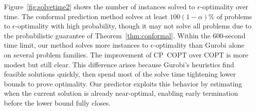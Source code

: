 \documentclass[12pt]{article}
\renewcommand{\cite}[1]{\citep{#1}}
\theoremstyle{definition}
\theoremstyle{remark}
\newcommand{\snote}[1]{}
\renewcommand{\snote}[1]{\textcolor{blue}{\textbf{\small [S: #1]}}}
\newcommand{\tol}{\epsilon}
\newcommand{\errorprob}{\alpha}
\newcommand{\snote}[1]{}
\renewcommand{\snote}[1]{\textcolor{blue}{\textbf{\small [Stefan: #1]}}}
\newcommand{\tol}{\epsilon}
\newcommand{\errorprob}{\alpha}
\theoremstyle{plain}
\theoremstyle{definition}
\theoremstyle{remark}
\begin{document}
Figure~\ref{fig:solvetime2} shows the number of instances solved to $\tol$-optimality over time.
The conformal prediction method solves at least $100(1-\errorprob)\%$ of problems to $\tol$-optimality with high probability, though it may not solve all problems due to the probabilistic guarantee of Theorem~\ref{thm:conformal}.
Within the 600-second time limit, our method solves more instances to $\tol$-optimality than Gurobi alone on several problem families.
The improvement of CP~COPT over COPT is more modest but still clear.
This difference arises because Gurobi's heuristics find feasible solutions quickly, then spend most of the solve time tightening lower bounds to prove optimality.
Our predictor exploits this behavior by estimating when the current solution is already near-optimal, enabling early termination before the lower bound fully closes.





\end{document}
